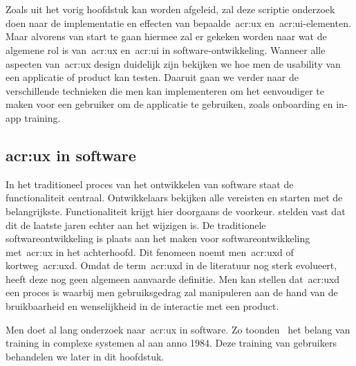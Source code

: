\chapter{}
\label{ch:stand-van-zaken}


Zoals uit het vorig hoofdstuk kan worden afgeleid, zal deze scriptie onderzoek doen naar de implementatie en effecten van bepaalde~\acrshort{acr:ux} en~\acrshort{acr:ui}-elementen. Maar alvorens van start te gaan hiermee zal er gekeken worden naar wat de algemene rol is van~\acrshort{acr:ux} en~\acrshort{acr:ui} in software-ontwikkeling. Wanneer alle aspecten van~\acrshort{acr:ux} design duidelijk zijn bekijken we hoe men de usability van een applicatie of product kan testen. Daaruit gaan we verder naar de verschillende technieken die men kan implementeren om het eenvoudiger te maken voor een gebruiker om de applicatie te gebruiken, zoals onboarding en in-app training.

\section{\acrlong{acr:ux} in software}
\label{sec:user-experience-in-software}

In het traditioneel proces van het ontwikkelen van software staat de functionaliteit centraal. Ontwikkelaars bekijken alle vereisten en starten met de belangrijkste. Functionaliteit krijgt hier doorgaans de voorkeur. \textcite{Harutyunyan2019} stelden vast dat dit de laatste jaren echter aan het wijzigen is. De traditionele softwareontwikkeling is plaats aan het maken voor softwareontwikkeling met~\acrlong{acr:ux} in het achterhoofd. Dit fenomeen noemt men~\acrfull{acr:uxd} of kortweg~\acrshort{acr:uxd}. Omdat de term~\acrshort{acr:uxd} in de literatuur nog sterk evolueert, heeft deze nog geen algemeen aanvaarde definitie. Men kan stellen dat~\acrlong{acr:uxd} een proces is waarbij men gebruiksgedrag zal manipuleren aan de hand van de bruikbaarheid en wenselijkheid in de interactie met een product.

Men doet al lang onderzoek naar~\acrlong{acr:ux} in software. Zo toonden~\textcite{Carroll1984} het belang van training in complexe systemen al aan anno 1984. Deze training van gebruikers behandelen we later in dit hoofdstuk.

